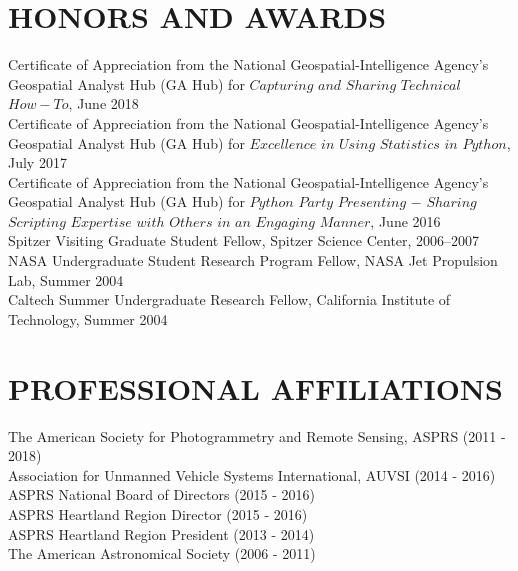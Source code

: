 \documentclass{res}
\begin{document}
\begin{resume}
\section{HONORS AND AWARDS} 
	Certificate of Appreciation from the National Geospatial-Intelligence Agency's Geospatial Analyst Hub (GA Hub) for $Capturing$ $and$ $Sharing$ $Technical$ $How-To$, June 2018\\
	Certificate of Appreciation from the National Geospatial-Intelligence Agency's Geospatial Analyst Hub (GA Hub) for $Excellence$ $in$ $Using$ $Statistics$ $in$ $Python$, July 2017\\
	Certificate of Appreciation from the National Geospatial-Intelligence Agency's Geospatial Analyst Hub (GA Hub) for $Python$ $Party$ $Presenting$ $-$ $Sharing$ $Scripting$ $Expertise$ $with$ $Others$ $in$ $an$ $Engaging$ $Manner$, June 2016\\
   Spitzer Visiting Graduate Student Fellow, Spitzer Science Center, 2006--2007   \\      
   NASA Undergraduate Student Research Program Fellow, NASA Jet Propulsion Lab, Summer 2004\\        
   Caltech Summer Undergraduate Research Fellow, California Institute of Technology, Summer 2004  

\section{PROFESSIONAL AFFILIATIONS}      
The American Society for Photogrammetry and Remote Sensing, ASPRS (2011 - 2018)\\
Association for Unmanned Vehicle Systems International, AUVSI (2014 - 2016)\\
ASPRS National Board of Directors (2015 - 2016)\\
ASPRS Heartland Region Director (2015 - 2016)\\
ASPRS Heartland Region President (2013 - 2014)\\
The American Astronomical Society (2006 - 2011)\\



\end{resume}
\end{document}
